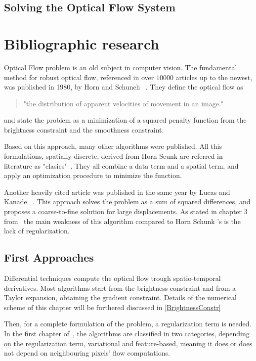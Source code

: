 \documentclass[12pt,a4paper,twoside]{report}
\begin{document}
\section{Solving the Optical Flow System}

\chapter{Bibliographic research}


{\color{red}{must be about 9 pages}}

Optical Flow problem is an old subject in computer vision. The fundamental method for robust optical flow, referenced in over $10000$ articles up to the newest, was published in 1980, by Horn and Schunch ~\cite{HSOpticalFlow}. They define the optical flow as
\begin{quote}
"the distribution of apparent velocities of movement in an image."
\end{quote}
and state the problem as a minimization of a squared penalty function from the brightness constraint and the smoothness constraint.

Based on this approach, many other algorithms were published. All this formulations, spatially-discrete, derived from Horn-Scunk are referred in literature as "clasics"~\cite{sun2010,QAnalysis}. They all combine a data term and a spatial term, and apply an optimization procedure to minimize the function. 

Another heavily cited article was published in the same year by Lucas and Kanade ~\cite{lucas1981}. This approach solves the problem as a sum of squared differences, and proposes a coarse-to-fine solution for large displacements. As stated in chapter 3 from~\cite{mitiche2014computer} the main weakness of this algorithm compared to Horn Schunk 's is the lack of regularization.
 


\section{First Approaches}

Differential techniques compute the optical flow trough spatio-temporal derivatives.
Most algorithms start from the brightness constraint and from a Taylor expansion, obtaining the gradient constraint. Details of the numerical scheme of this chapter will be furthered discussed in \ref{BrightnessConstr}

Then, for a complete formulation of the problem, a regularization term is needed. In the first chapter of~\cite{wedel2011stereo}, the algorithms are classified in two categories, depending on the regularization term, variational and feature-based, meaning it does or does not depend on neighbouring pixels' flow computations.
\end{document}
